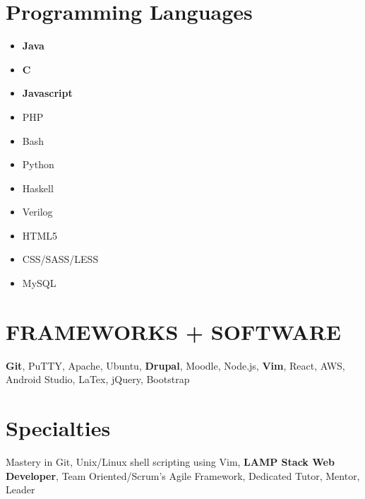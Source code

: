 \documentclass{Resume_Latex_Class}
\begin{document}
\begin{multicols}{2}
\section{Programming Languages}

\begin{itemize}[wide=0pt, itemsep=-5pt]
	\item[] \textbf{Java}
	\item[] \textbf{C}
	\item[] \textbf{Javascript}
	\item[] PHP
	\item[] Bash
	\item[] Python
	\item[] Haskell
	\item[] Verilog
	\item[] HTML5
	\item[] CSS/SASS/LESS
	\item[] MySQL
\end{itemize}

\section{FRAMEWORKS + SOFTWARE}
\textbf{Git}, PuTTY, Apache, Ubuntu, \textbf{Drupal}, Moodle, Node.js, \textbf{Vim}, React, AWS, Android Studio, LaTex, jQuery, Bootstrap

\section{Specialties}
Mastery in Git, Unix/Linux shell scripting using Vim, \textbf{LAMP Stack Web Developer}, Team Oriented/Scrum's Agile Framework, Dedicated Tutor, Mentor, Leader
\end{multicols}
\end{document}
